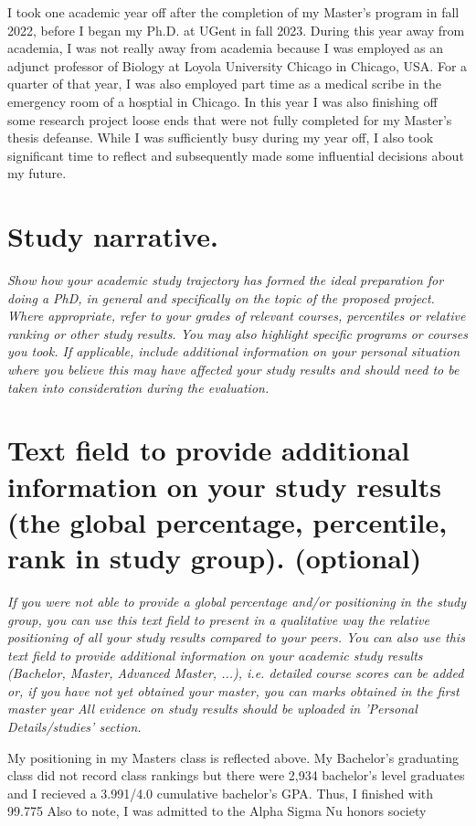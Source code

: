 {I took one academic year off after the completion of my Master's program in fall 2022, before I began my Ph.D. at UGent in fall 2023. 
During this year away from academia, I was not really away from academia because I was employed as an adjunct professor of Biology at Loyola University Chicago in Chicago, USA.
For a quarter of that year, I was also employed part time as a medical scribe in the emergency room of a hosptial in Chicago.
In this year I was also finishing off some research project loose ends that were not fully completed for my Master's thesis defeanse.
While I was sufficiently busy during my year off, I also took significant time to reflect and subsequently made some influential decisions about my future.

\section{Study narrative.}
\textit{
Show how your academic study trajectory has formed the ideal preparation for doing a PhD, in general and specifically on the topic of the proposed project. Where appropriate, refer to your grades of relevant courses, percentiles or relative ranking or other study results. You may also highlight specific programs or courses you took. If applicable, include additional information on your personal situation where you believe this may have affected your study results and should need to be taken into consideration during the evaluation.
}



\section{Text field to provide additional information on your study results (the global percentage, percentile, rank in study group). (optional)}
\textit{
If you were not able to provide a global percentage and/or positioning in the study group, you can use this text field to present in a qualitative way the relative positioning of all your study results compared to your peers. You can also use this text field to provide additional information on your academic study results (Bachelor, Master, Advanced Master, ...), i.e. detailed course scores can be added or, if you have not yet obtained your master, you can marks obtained in the first master year All evidence on study results should be uploaded in 'Personal Details/studies' section.
}

My positioning in my Masters class is reflected above.
My Bachelor's graduating class did not record class rankings but there were 2,934 bachelor's level graduates and I recieved a 3.991/4.0 cumulative bachelor's GPA. Thus, I finished with 99.775%
Also to note, I was admitted to the Alpha Sigma Nu honors society 


}

